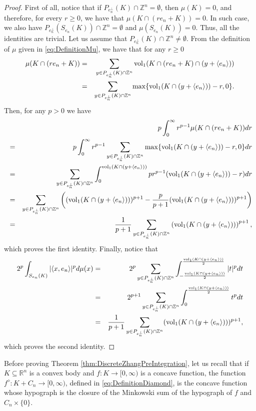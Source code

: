 \documentclass[10pt]{amsart}
\def\R{\mathbb{R}}
\def\Z{\mathbb{Z}}
\def\vol{\mathrm{vol}}
\numberwithin{equation}{section}
\begin{document}
\begin{proof}
First of all, notice that if $P_{e_n^\perp}(K)\cap\Z^n=\emptyset$, then $\mu(K)=0$, and therefore, for every $r\geq 0$, we have that $\mu(K\cap(re_n+K))=0$. In such case, we also have  $P_{e_n^\perp}(S_{e_n}(K))\cap\Z^n=\emptyset$ and $\mu(S_{e_n}(K))=0$. Thus, all the identities are trivial. Let us assume that $P_{e_n^\perp}(K)\cap\Z^n\neq\emptyset$. From the definition of $\mu$ given in \eqref{eq:DefinitionMu}, we have that for any $r\geq0$
\begin{eqnarray*}
\mu(K\cap(re_n+K))&=&\sum_{y\in P_{e_n^\perp}(K)\cap\Z^n}\vol_1(K\cap(re_n+K)\cap(y+\langle e_n\rangle))\cr
&=&\sum_{y\in P_{e_n^\perp}(K)\cap\Z^n}\max\{\vol_1(K\cap (y+\langle e_n\rangle))-r,0\}.
\end{eqnarray*}
Then, for any $p>0$ we have
\begin{eqnarray*}
&&p\int_0^{\infty}r^{p-1}\mu(K\cap(re_n+K))dr\cr
&=&p\int_0^{\infty}r^{p-1}\sum_{y\in P_{e_n^\perp}(K)\cap\Z^n}\max\{\vol_1(K\cap (y+\langle e_n\rangle))-r,0\}dr\cr
&=&\sum_{y\in P_{e_n^\perp}(K)\cap\Z^n}\int_0^{\vol_1(K\cap (y+\langle e_n\rangle))}pr^{p-1}(\vol_1(K\cap (y+\langle e_n\rangle))-r)dr\cr
&=&\sum_{y\in P_{e_n^\perp}(K)\cap\Z^n}\left((\vol_1(K\cap (y+\langle e_n\rangle)))^{p+1}-\frac{p}{p+1}(\vol_1(K\cap (y+\langle e_n\rangle)))^{p+1}\right)\cr
&=&\frac{1}{p+1}\sum_{y\in P_{e_n^\perp}(K)\cap\Z^n}\left(\vol_1(K\cap (y+\langle e_n\rangle))\right)^{p+1},
\end{eqnarray*}
which proves the first identity. Finally, notice that
\begin{eqnarray*}
2^p\int_{S_{e_n}(K)}|\langle x,e_n\rangle|^pd\mu(x)&=&2^p\sum_{y\in P_{e_n^\perp}(K)\cap\Z^n}\int_{-\frac{\vol_1(K\cap(y+\langle e_n\rangle))}{2}}^{\frac{\vol_1(K\cap(y+\langle e_n\rangle))}{2}}|t|^pdt\cr
&=&2^{p+1}\sum_{y\in P_{e_n^\perp}(K)\cap\Z^n}\int_0^{\frac{\vol_1(K\cap(y+\langle e_n\rangle))}{2}}t^pdt\cr
&=&\frac{1}{p+1}\sum_{y\in P_{e_n^\perp}(K)\cap\Z^n}(\vol_1(K\cap(y+\langle e_n\rangle)))^{p+1},\cr
\end{eqnarray*}
which proves the second identity.
\end{proof}




Before proving Theorem \ref{thm:DiscreteZhangPreIntegration}, let us recall that if $K\subseteq\R^n$ is a convex body and $f:K\to[0,\infty)$ is a concave function, the function $f^\diamond:K+C_n\to[0,\infty)$, defined  in \eqref{eq:DefinitionDiamond}, is the concave function whose hypograph is the closure of the Minkowski sum of the hypograph of $f$ and $C_n\times\{0\}$.
\end{document}
